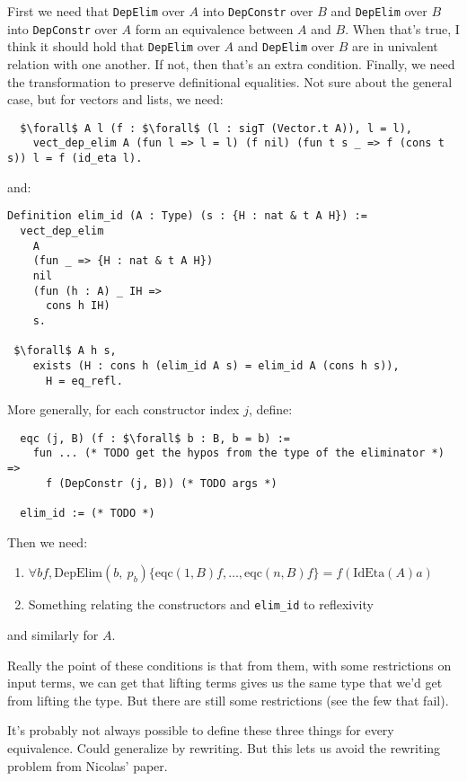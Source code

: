 First we need that \lstinline{DepElim} over $A$ into \lstinline{DepConstr} over $B$ and \lstinline{DepElim} over $B$ into
\lstinline{DepConstr} over $A$ form an equivalence between $A$ and $B$. When that's true, I think it should hold that \lstinline{DepElim} over $A$
and \lstinline{DepElim} over $B$ are in univalent relation with one another. If not, then that's an extra condition.
Finally, we need the transformation to preserve definitional equalities. Not sure about the general case, but for vectors and lists,
we need:

\begin{lstlisting}
  $\forall$ A l (f : $\forall$ (l : sigT (Vector.t A)), l = l),
    vect_dep_elim A (fun l => l = l) (f nil) (fun t s _ => f (cons t s)) l = f (id_eta l).
\end{lstlisting}
and:

\begin{lstlisting}
Definition elim_id (A : Type) (s : {H : nat & t A H}) :=
  vect_dep_elim
    A
    (fun _ => {H : nat & t A H})
    nil
    (fun (h : A) _ IH =>
      cons h IH)
    s.

 $\forall$ A h s,
    exists (H : cons h (elim_id A s) = elim_id A (cons h s)),
      H = eq_refl.
\end{lstlisting}
More generally, for each constructor index $j$, define:

\begin{lstlisting}
  eqc (j, B) (f : $\forall$ b : B, b = b) :=
    fun ... (* TODO get the hypos from the type of the eliminator *) =>
      f (DepConstr (j, B)) (* TODO args *)

  elim_id := (* TODO *)
\end{lstlisting}
Then we need:

\begin{enumerate}
\item $\forall b f, \mathrm{DepElim}(b,\ p_{b}) \{\mathrm{eqc} (1, B) f, \ldots, \mathrm{eqc} (n, B) f\} = f (\mathrm{IdEta}(A) a) $
\item Something relating the constructors and \lstinline{elim_id} to reflexivity
\end{enumerate}
and similarly for $A$.

Really the point of these conditions is that from them, with some restrictions on input terms, we can get
that lifting terms gives us the same type that we'd get from lifting the type. But there are still
some restrictions (see the few that fail).

It's probably not always possible to define these three things for every equivalence.
Could generalize by rewriting. But this lets us avoid the rewriting problem from Nicolas' paper.

